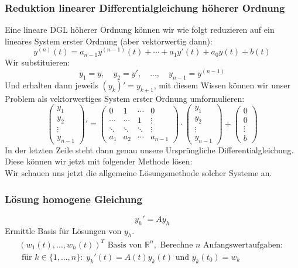 \documentclass[a4paper]{article}
\newcommand{\R}{\mathbb{R}}
\begin{document}
\subsubsection{Reduktion linearer Differentialgleichung höherer Ordnung}
Eine lineare DGL höherer Ordnung können wir wie folgt reduzieren
auf ein lineares System erster Ordnung (aber vektorwertig dann):
\[
	y ^{(n)} (t) = a_{n-1} y ^{(n-1)} (t)
	+ \cdots +
	a_1 y' (t) + a_0 y (t)
	+ b(t)
\] 
Wir substituieren:
\[
	y_1 = y, \quad
	y_2 = y', \quad
	..., \quad
	y_{n-1} = y ^{(n-1)}
\] 
Und erhalten dann jeweils $(y_k)' = y_{k+1}$,
mit diesem Wissen können wir unser Problem als vektorwertiges
System erster Ordnung umformulieren:
\[
	\begin{pmatrix} 
		y_1 \\
		y_2 \\
		\vdots \\
		y_{n-1}
	\end{pmatrix}'
	=
	\begin{pmatrix}
		0 & 1 & \cdots & 0 \\
		\cdots & \cdots & 1 & \vdots \\
		\ddots & \ddots & \ddots & \vdots \\
		a_1 & a_2 & \cdots & a_{n-1}
	\end{pmatrix} \cdot
	\begin{pmatrix} 
		y_1 \\
		y_2 \\
		\vdots \\
		y_{n-1}
	\end{pmatrix}
	+ 
	\begin{pmatrix} 
		0 \\
		0 \\
		\vdots \\
		b
	\end{pmatrix}
\] 
In der letzten Zeile steht dann genau unsere Ursprüngliche Differentialgleichung.
Diese können wir jetzt mit folgender Methode lösen:
\\

Wir schauen uns jetzt die allgemeine Lösungsmethode solcher
Systeme an.

\subsubsection{Lösung homogene Gleichung}
\[
	y_h ' = A y_h
\]
Ermittle Basis für Lösungen von $y_h$.
\begin{gather*}
	(w_1(t), ..., w_{n} (t)) ^{T} \text{ Basis von } \R ^{n},
	\text{ Berechne $n$ Anfangswertaufgaben: } \\
	\text{ für } k \in \{
		1, ..., n
	\}: \;
	y_{k}' (t) = A(t) y_{k} (t) \text{ und }
	y_k (t_0) = w_k
\end{gather*}
\end{document}
